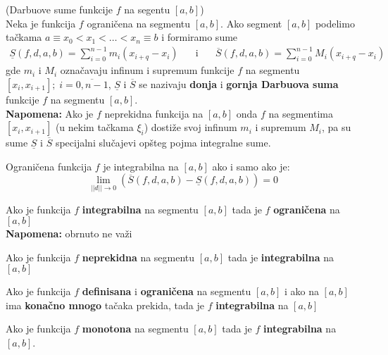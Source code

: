 \begin{definition}
	(Darbuove sume funkcije $f$ na segentu $[a,b]$)\\
	Neka je funkcija $f$ ograničena na segmentu $[a,b]$. Ako segment $[a,b]$ podelimo tačkama $a \equiv x_0 < x_1 < \ldots < x_n \equiv b$ i formiramo sume 
	$$\begin{aligned}
		\underline{S}(f,d,a,b) = \sum^{n-1}_{i=0} m_i(x_{i+q}-x_i)
	\end{aligned}
	\quad \text{ i } \quad
	\begin{aligned}
		\overline{S}(f,d,a,b) = \sum^{n-1}_{i=0} M_i(x_{i+q}-x_i)
	\end{aligned}$$
	gde $m_i$ i $M_i$ označavaju infinum i supremum funkcije $f$ na segmentu $[x_i,x_{i+1}]; \; i=\overline{0, n-1}$, $\underline{S}$ i $\overline{S}$ se nazivaju \textbf{donja} i \textbf{gornja Darbuova suma} funkcije $f$ na segmentu $[a,b]$.\\
	\textbf{Napomena:} Ako je $f$ neprekidna funkcija na $[a,b]$ onda $f$ na segmentima $[x_i,x_{i+1}]$ (u nekim tačkama $\xi_i$) dostiže svoj infinum $m_i$ i supremum $M_i$, pa su sume $\underline{S}$ i $\overline{S}$ specijalni slučajevi opšteg pojma integralne sume.
\end{definition}
\begin{theorem}
	Ograničena funkcija $f$ je integrabilna na $[a,b]$ ako i samo ako je: $$\lim_{||d||\to 0} \left(\overline{S}(f,d,a,b) - \underline{S}(f,d,a,b)\right) = 0$$
\end{theorem}
\begin{theorem}
	Ako je funkcija $f$ \textbf{integrabilna} na segmentu $[a,b]$ tada je $f$ \textbf{ograničena} na $[a,b]$ \\
	\textbf{Napomena:} obrnuto ne važi
\end{theorem}
\begin{theorem}
	Ako je funkcija $f$ \textbf{neprekidna} na segmentu $[a,b]$ tada je \textbf{integrabilna} na $[a,b]$
\end{theorem}
\begin{theorem}
	Ako je funkcija $f$ \textbf{definisana} i  \textbf{ograničena} na segmentu $[a,b]$ i ako na $[a,b]$ ima \textbf{konačno mnogo} tačaka prekida, tada je $f$ \textbf{integrabilna} na $[a,b]$
\end{theorem}
\begin{theorem}
	Ako je funkcija $f$ \textbf{monotona} na segmentu $[a,b]$ tada je $f$ \textbf{integrabilna} na $[a,b]$.
\end{theorem}


